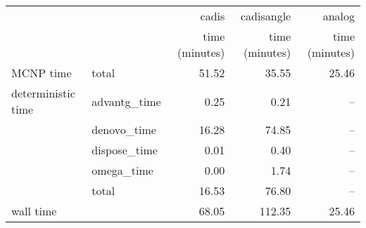 \begin{tabular}{llrrr}
\toprule
          &              &          cadis &     cadisangle &         analog \\
          &              & time (minutes) & time (minutes) & time (minutes) \\
\midrule
MCNP time & total &          51.52 &          35.55 &          25.46 \\
deterministic time & advantg\_time &           0.25 &           0.21 &            -- \\
          & denovo\_time &          16.28 &          74.85 &            -- \\
          & dispose\_time &           0.01 &           0.40 &            -- \\
          & omega\_time &           0.00 &           1.74 &            -- \\
          & total &          16.53 &          76.80 &            -- \\
wall time &              &          68.05 &         112.35 &          25.46 \\
\bottomrule
\end{tabular}
